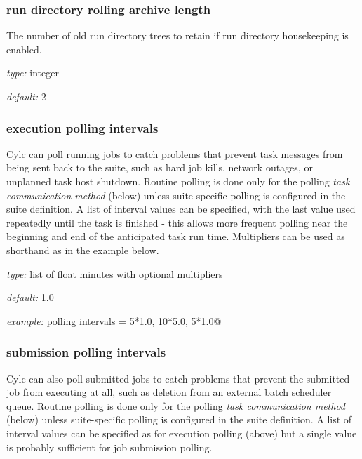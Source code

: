 \subsubsection{run directory rolling archive length}

The number of old run directory trees to retain if run directory
housekeeping is enabled.
\begin{myitemize}
\item {\em type:} integer
\item {\em default:} 2
\end{myitemize}

\subsubsection{execution polling intervals}

Cylc can poll running jobs to catch problems that prevent task messages
from being sent back to the suite, such as hard job kills, network
outages, or unplanned task host shutdown. Routine polling is done only 
for the polling {\em task communication method} (below) unless 
suite-specific polling is configured in the suite definition.
A list of interval values can be specified, with the last value used
repeatedly until the task is finished - this allows more frequent
polling near the beginning and end of the anticipated task run time.
Multipliers can be used as shorthand as in the example below.

\begin{myitemize}
\item {\em type:} list of float minutes with optional multipliers
\item {\em default:} 1.0
\item {\em example:} \lstinline@execution polling intervals = 5*1.0, 10*5.0, 5*1.0@
\end{myitemize}


\subsubsection{submission polling intervals}

Cylc can also poll submitted jobs to catch problems that prevent the
submitted job from executing at all, such as deletion from an external 
batch scheduler queue. Routine polling is done only for the polling {\em
task communication method} (below) unless suite-specific polling
is configured in the suite definition. A list of interval
values can be specified as for execution polling (above) but a single
value is probably sufficient for job submission polling. 

